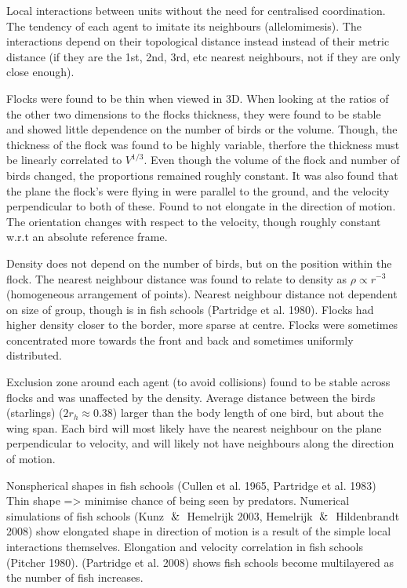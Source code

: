 \documentclass[10pt,twocolumn]{revtex4-2}    %
\begin{document}
Local interactions between units without the need for centralised coordination. The tendency of each agent to imitate its neighbours (allelomimesis). The interactions depend on their topological distance instead instead of their metric distance (if they are the 1st, 2nd, 3rd, etc nearest neighbours, not if they are only close enough).

Flocks were found to be thin when viewed in 3D. When looking at the ratios of the other two dimensions to the flocks thickness, they were found to be stable and showed little dependence on the number of birds or the volume. Though, the thickness of the flock was found to be highly variable, therfore the thickness must be linearly correlated to $V^{1/3}$. Even though the volume of the flock and number of birds changed, the proportions remained roughly constant. It was also found that the plane the flock's were flying in were parallel to the ground, and the velocity perpendicular to both of these. Found to not elongate in the direction of motion. The orientation changes with respect to the velocity, though roughly constant w.r.t an absolute reference frame.

Density does not depend on the number of birds, but on the position within the flock. The nearest neighbour distance was found to relate to density as $\rho \propto r^{-3}$ (homogeneous arrangement of points). Nearest neighbour distance not dependent on size of group, though is in fish schools (Partridge et al. 1980). Flocks had higher density closer to the border, more sparse at centre. Flocks were sometimes concentrated more towards the front and back and sometimes uniformly distributed. 

Exclusion zone around each agent (to avoid collisions) found to be stable across flocks and was unaffected by the density. Average distance between the birds (starlings) ($2r_h \approx 0.38$) larger than the body length of one bird, but about the wing span. Each bird will most likely have the nearest neighbour on the plane perpendicular to velocity, and will likely not have neighbours along the direction of motion. 

Nonspherical shapes in fish schools (Cullen et al. 1965, Partridge et al. 1983) Thin shape => minimise chance of being seen by predators. Numerical simulations of fish schools (Kunz $\And$ Hemelrijk 2003, Hemelrijk $\And$ Hildenbrandt 2008) show elongated shape in direction of motion is a result of the simple local interactions themselves. Elongation and velocity correlation in fish schools (Pitcher 1980). (Partridge et al. 2008) shows fish schools become multilayered as the number of fish increases.
\end{document}
